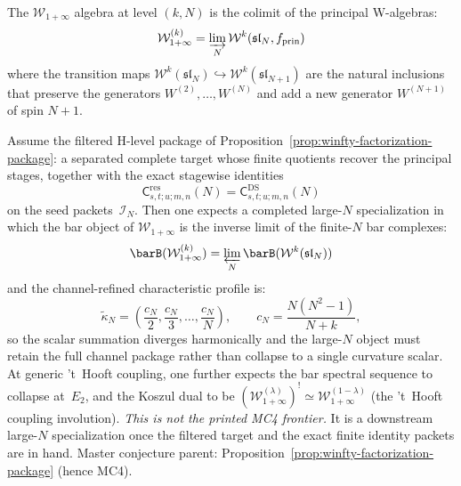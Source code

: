 \begin{definition}
\label{def:w-infty}
The $\mathcal{W}_{1+\infty}$ algebra at level $(k, N)$ is the
colimit of the principal W-algebras:
\[
\mathcal{W}_{1+\infty}^{(k)}
= \varinjlim_{N} \mathcal{W}^k(\mathfrak{sl}_N, f_{\mathrm{prin}})
\]
where the transition maps
$\mathcal{W}^k(\mathfrak{sl}_N) \hookrightarrow
\mathcal{W}^k(\mathfrak{sl}_{N+1})$ are the natural inclusions
that preserve the generators $W^{(2)}, \ldots, W^{(N)}$ and add a
new generator $W^{(N+1)}$ of spin $N+1$.
\end{definition}

\begin{conjecture}
\label{conj:w-infty-bar}
Assume the filtered H-level package of
Proposition~\ref{prop:winfty-factorization-package}: a separated
complete target whose finite quotients recover the principal stages,
together with the exact stagewise identities
\[
\mathsf{C}^{\mathrm{res}}_{s,t;u;m,n}(N)
=
\mathsf{C}^{\mathrm{DS}}_{s,t;u;m,n}(N)
\]
on the seed packets~$\mathcal{I}_N$.  Then one expects a completed
large-$N$ specialization in which the bar object of
$\mathcal{W}_{1+\infty}$ is the inverse limit of the finite-$N$ bar
complexes:
\begin{equation}\label{eq:w-infty-bar}
\barB(\mathcal{W}_{1+\infty}^{(k)})
= \varprojlim_{N} \barB(\mathcal{W}^k(\mathfrak{sl}_N))
\end{equation}
and the channel-refined characteristic profile is:
\begin{equation}\label{eq:w-infty-curvature}
\widetilde{\kappa}_N
=
\left(\frac{c_N}{2},\frac{c_N}{3},\ldots,\frac{c_N}{N}\right),
\qquad c_N = \frac{N(N^2-1)}{N+k},
\end{equation}
so the scalar summation diverges harmonically and the large-$N$ object
must retain the full channel package rather than collapse to a single
curvature scalar.  At generic 't~Hooft coupling, one further expects
the bar spectral sequence to collapse at~$E_2$, and the Koszul dual to
be
$(\mathcal{W}_{1+\infty}^{(\lambda)})^!
\simeq \mathcal{W}_{1+\infty}^{(1-\lambda)}$
\textup{(}the 't~Hooft coupling involution\textup{)}.
\emph{This is not the printed MC4 frontier.}  It is a downstream
large-$N$ specialization once the filtered target and the exact finite
identity packets are in hand.
\textup{Master conjecture parent:}
Proposition~\textup{\ref{prop:winfty-factorization-package}}
\textup{(}hence MC4\textup{)}.
\end{conjecture}

